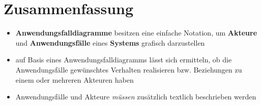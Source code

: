 \section{Zusammenfassung}



\begin{itemize}
    \item \textbf{Anwendungsfalldiagramme} besitzen eine einfache Notation, um \textbf{Akteure} und \textbf{Anwendungsfälle} eines \textbf{Systems} grafisch darzustellen
    \item auf Basis eines Anwendungsfalldiagramms lässt sich ermitteln, ob die Anwendungsfälle gewünschtes Verhalten realisieren bzw. Beziehungen zu einem oder mehreren Akteuren haben
    \item Anwendungsfälle und Akteure \textit{müssen} zusätzlich textlich beschrieben werden
\end{itemize}